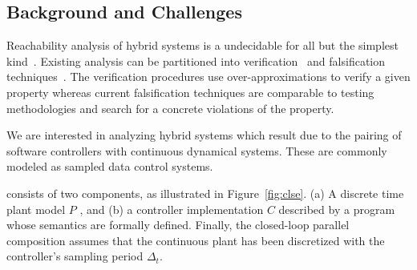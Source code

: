 






\subsection{Background and Challenges}

Reachability analysis of hybrid systems is a undecidable for all but
the simplest kind~\cite{henzinger1995s}. Existing analysis can be
partitioned into verification~\cite{tiwari2012hybridsal,
Chen2012taylor, Frehse+Others/2011/SpaceEx, althoff2016combining,
duggirala2015c2e2} and falsification techniques~\cite{annpureddy2011s,
donze2010breach, dreossi2015efficient}. The verification procedures
use over-approximations to verify a given property whereas current
falsification techniques are comparable to testing methodologies and
search for a concrete violations of the property.

We are interested in analyzing hybrid systems which result due to the
pairing of software controllers with continuous dynamical systems.
These are commonly modeled as sampled data control systems.


 consists of two
components, as illustrated in Figure~\ref{fig:clse}. (a) A discrete
time plant model $P$ , and (b) a controller implementation $C$
described by a program whose semantics are formally defined.  Finally,
the closed-loop parallel composition assumes that the continuous plant
has been discretized with the controller's sampling period $\Delta_t$.

